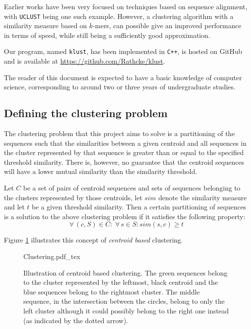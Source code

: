 Earlier works have been very focused on techniques based on sequence alignment,
with \texttt{UCLUST} being one such example. However, a clustering algorithm
with a similarity measure based on $k$-mers, can possible give an improved
performance in terms of speed, while still being a sufficiently good
approximation.

Our program, named \texttt{klust}, has been implemented in \texttt{C++}, is
hosted on GitHub and is available at \url{https://github.com/Rathcke/klust}.

The reader of this document is expected to have a basic knowledge of computer
science, corresponding to around two or three years of undergraduate studies.


\subsection{Defining the clustering problem}

The clustering problem that this project aims to solve is a partitioning of the
sequences such that the similarities between a given centroid and all sequences
in the cluster represented by that sequence is greater than or equal to the
specified threshold similarity. There is, however, no guarantee that the
centroid sequences will have a lower mutual similarity than the similarity
threshold.

Let $C$ be a set of pairs of centroid sequences and sets of sequences belonging
to the clusters represented by those centroids, let $sim$ denote the similarity
measure and let $t$ be a given threshold similarity. Then a certain
partitioning of sequences is a solution to the above clustering problem if it
satisfies the following property:
\[
  \forall\, (c,S) \in C:\; \forall\, s \in S: sim(s,c) \geq t
\]

Figure \ref{fig:clustering_concept} illustrates this concept of \emph{centroid
based} clustering.

\begin{figure}[h!]
  \centering
  \def\svgwidth{\columnwidth}
  {Clustering.pdf_tex}
  \caption{Illustration of centroid based clustering. The green sequences
    belong to the cluster represented by the leftmost, black centroid and the
    blue sequences belong to the rightmost cluster. The middle sequence, in the
    intersection between the circles, belong to only the left cluster although
    it could possibly belong to the right one instead (as indicated by
    the dotted arrow).}
  \label{fig:clustering_concept}
\end{figure}
